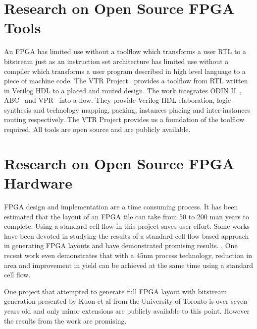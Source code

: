 \section{Research on Open Source FPGA Tools}
\label{sec:bkg_tools}

An FPGA has limited use without a toolflow which transforms a user RTL to a bitstream
just as an instruction set architecture has limited use without a compiler which transforms
a user program described in high level language to a piece of machine code. 
The VTR Project~\cite{Rose:2012:VPA:2145694.2145708} provides a toolflow from RTL written in Verilog
HDL to a placed and routed design. The work integrates ODIN II~\cite{Jamieson:2010:OIO:1827716.1827870},
ABC~\cite{Brayton:2010:AAI:2144310.2144317} and VPR~\cite{Luu:2011:VFC:2068716.2068718} into a flow.
They provide Verilog HDL elaboration, logic synthesis and technology mapping, packing, instances placing
and inter-instances routing respectively. The VTR Project provides us a foundation of the toolflow required.
All tools are open source and are publicly available. \par

\section{Research on Open Source FPGA Hardware}
\label{sec:bkg_hdw}

FPGA design and implementation are a time consuming process. It has
been estimated that the layout of an FPGA tile can take from 50 to 200 
man years to complete. \cite{Padalia:2003:ATP:611817.611842} Using a standard
cell flow in this project saves user effort. Some works have been devoted
 in studying the results of a standard cell flow based approach
in generating FPGA layouts and have demonstrated promising results. 
\cite{Neumann:2008:DFE:1403375.1403391}, \cite{Chaudhuri:2008:RRF:1391469.1391500}
One recent work even demonstrates that with a 45nm process technology, reduction 
in area and improvement in yield can be achieved at the same time
using a standard cell flow. \cite{Chen:2011:RFR:1950413.1950484} \par

One project that attempted to generate full FPGA layout with bitstream generation presented
 by Kuon et al from the University of Toronto \cite{Kuon:2005:DLV:1046192.1046220} is over seven years old
and only minor extensions are publicly available to this point. However the results from the work are promising. \par

